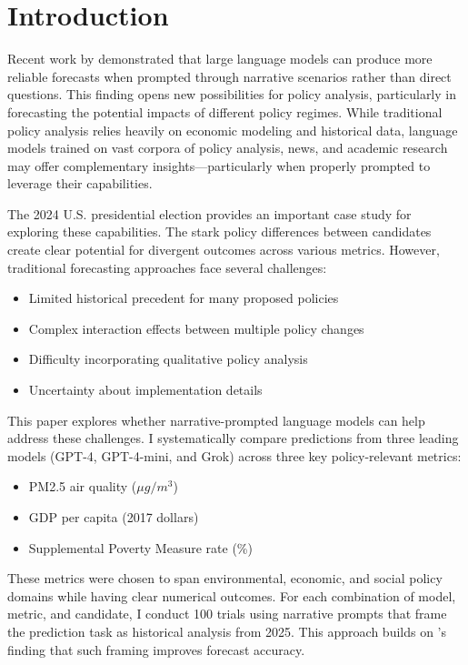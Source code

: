 \section{Introduction}

Recent work by \cite{cunningham2024base} demonstrated that large language models can produce more reliable forecasts when prompted through narrative scenarios rather than direct questions. This finding opens new possibilities for policy analysis, particularly in forecasting the potential impacts of different policy regimes. While traditional policy analysis relies heavily on economic modeling and historical data, language models trained on vast corpora of policy analysis, news, and academic research may offer complementary insights---particularly when properly prompted to leverage their capabilities.

The 2024 U.S. presidential election provides an important case study for exploring these capabilities. The stark policy differences between candidates create clear potential for divergent outcomes across various metrics. However, traditional forecasting approaches face several challenges:

\begin{itemize}
    \item Limited historical precedent for many proposed policies
    \item Complex interaction effects between multiple policy changes
    \item Difficulty incorporating qualitative policy analysis
    \item Uncertainty about implementation details
\end{itemize}

This paper explores whether narrative-prompted language models can help address these challenges. I systematically compare predictions from three leading models (GPT-4, GPT-4-mini, and Grok) across three key policy-relevant metrics:

\begin{itemize}
    \item PM2.5 air quality ($\mu g/m^3$)
    \item GDP per capita (2017 dollars)
    \item Supplemental Poverty Measure rate (\%)
\end{itemize}

These metrics were chosen to span environmental, economic, and social policy domains while having clear numerical outcomes. For each combination of model, metric, and candidate, I conduct 100 trials using narrative prompts that frame the prediction task as historical analysis from 2025. This approach builds on \cite{cunningham2024base}'s finding that such framing improves forecast accuracy.

